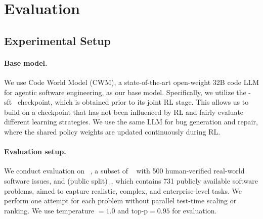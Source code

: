 \section{Evaluation}
\label{section:evaluation}
\subsection{Experimental Setup}
\label{subsec:setup}

\paragraph{Base model.}
We use Code World Model (CWM), a state-of-the-art open-weight 32B code LLM for agentic software engineering, as our base model. Specifically, we utilize the \cwm-sft~\cite{cwmsft} checkpoint, which is obtained prior to its joint RL stage.
This allows us to build on a checkpoint that has not been influenced by RL and fairly evaluate different learning strategies.
We use the same LLM for bug generation and repair, where the shared policy weights are updated continuously during RL.

\paragraph{Evaluation setup.}
We conduct evaluation on \sbv~\cite{swebverified}, a subset of \swebench~\cite{swebench} with 500 human-verified real-world software issues, and \sbp{} (public split)~\cite{deng2025swebenchproaiagents},  which contains 731 publicly available software problems, aimed to capture realistic, complex, and enterprise-level tasks.
We perform one attempt for each problem without parallel test-time scaling or ranking.
We use temperature $= 1.0$ and $\textrm{top-p} = 0.95$ for evaluation.

